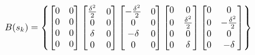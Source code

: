 \documentclass[twocolumn]{article}
\begin{document}
\begin{equation*}%
    \resizebox{.9 \columnwidth}{!}{
        $B(s_{k})=\begin{Bmatrix}
                \begin{bmatrix}
                    0 & 0 \\
                    0 & 0 \\
                    0 & 0 \\
                    0 & 0 \\
                \end{bmatrix}
                \begin{bmatrix}
                    \frac{\delta^{2}}{2} & 0 \\
                    0                    & 0 \\
                    \delta               & 0 \\
                    0                    & 0 \\
                \end{bmatrix}
                \begin{bmatrix}
                    -\frac{\delta^{2}}{2} & 0 \\
                    0                     & 0 \\
                    -\delta               & 0 \\
                    0                     & 0 \\
                \end{bmatrix}
                \begin{bmatrix}
                    0 & 0                    \\
                    0 & \frac{\delta^{2}}{2} \\
                    0 & 0                    \\
                    0 & \delta               \\
                \end{bmatrix}
                \begin{bmatrix}
                    0 & 0                     \\
                    0 & -\frac{\delta^{2}}{2} \\
                    0 & 0                     \\
                    0 & -\delta               \\
                \end{bmatrix}
            \end{Bmatrix} $
    }
\end{equation*}
\end{document}
